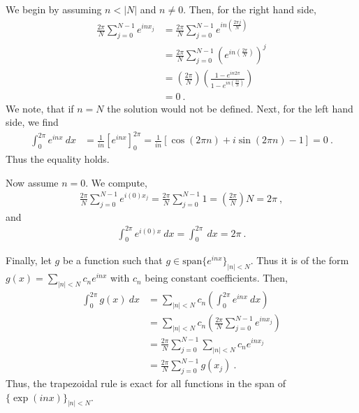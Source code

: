 
\begin{questions}


\begin{solution}

We begin by assuming $n < |N|$ and $n \neq 0$. Then, for the right hand side,
\begin{align*}
\frac{2\pi}{N}\sum_{j=0}^{N-1} e^{inx_j} &= \frac{2\pi}{N}\sum_{j=0}^{N-1} e^{in\left(\frac{2\pi j}{N} \right)} \\
&=  \frac{2\pi}{N}\sum_{j=0}^{N-1} \left(e^{in\left(\frac{2\pi}{N} \right)}\right)^j \\
& = \left(\frac{2\pi}{N}\right)\left(\frac{1-e^{in2\pi}}{1-e^{in\left(\frac{2\pi}{N}\right)}} \right) \\
& = 0~.
\end{align*}
We note, that if $n=N$ the solution would not be defined. Next, for the left hand side, we find
\begin{align*}
\int_0^{2\pi} e^{inx} ~dx &= \frac{1}{in}\left[e^{inx}\right]_0^{2\pi} = \frac{1}{in} \left[\cos(2\pi n)+i\sin(2\pi n) - 1\right] = 0~.
\end{align*}
Thus the equality holds.

Now assume $n=0$. We compute,
\begin{align*}
\frac{2\pi}{N}\sum_{j=0}^{N-1} e^{i(0)x_j} = \frac{2\pi}{N}\sum_{j=0}^{N-1} 1 = \left(\frac{2\pi}{N} \right) N = 2\pi~,
\end{align*}
and
\begin{align*}
\int_0^{2\pi} e^{i(0)x} ~dx = \int_0^{2\pi} ~dx = 2\pi~.
\end{align*}

Finally, let $g$ be a function such that $g \in \text{span} \{e^{inx}\}_{|n|<N}$. Thus it is of the form $g(x) = \sum_{|n|<N} c_ne^{inx}$ with $c_n$ being constant coefficients. Then,
\begin{align*}
\int_0^{2\pi} g(x)~dx &= \sum_{|n|<N} c_n\left( \int_0^{2\pi} e^{inx}~dx \right)\\ &= \sum_{|n|<N} c_n \left( \frac{2\pi}{N}\sum_{j=0}^{N-1} e^{inx_j} \right)\\ &= \frac{2\pi}{N} \sum_{j=0}^{N-1} \sum_{|n|<N} c_ne^{inx_j} \\
&= \frac{2\pi}{N} \sum_{j=0}^{N-1} g(x_j)~.
\end{align*}
Thus, the trapezoidal rule is exact for all functions in the span of $\{\exp(inx)\}_{|n|<N}$.

\end{solution}

\end{questions}
